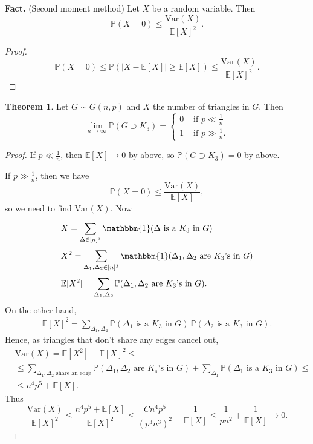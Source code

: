 \documentclass{article}
\theoremstyle{definition}
\newtheorem{theorem}{Theorem}[section]
\begin{document}
\textbf{Fact.} (Second moment method) Let $X$ be a random variable. Then \[
\mathbb{P}(X = 0) \le \frac{\text{Var}(X)}{\mathbb{E}[X]^2}.
\] 
\begin{proof}
    \[
    \mathbb{P}(X = 0) \le \mathbb{P}(|X - \mathbb{E}[X]| \ge \mathbb{E}[X]) \le \frac{\text{Var}(X)}{\mathbb{E}[X]^2}.
    \]
\end{proof}
\begin{theorem}
    Let $G \sim G(n,p)$ and $X$ the number of triangles in $G$. Then \[
    \lim_{n \to \infty} \mathbb{P}(G \supset K_3) = \begin{cases}
        0 &\text{ if } p \ll \frac{1}{n}\\
        1 &\text{ if } p \gg \frac{1}{n}.
    \end{cases}
    \]
\end{theorem}
\begin{proof}
    If $p \ll \frac{1}{n}$, then $\mathbb{E}[X] \to 0$ by above, so $\mathbb{P}(G \supset K_3) = 0$ by above.
    \vspace{1mm}
    
    If $p \gg \frac{1}{n}$, then we have \[
    \mathbb{P}(X=0)\le \frac{\text{Var}(X)}{\mathbb{E}[X]},
    \]
    so we need to find $\text{Var}(X)$. Now 
    \begin{align*}
    &X = \sum_{\Delta \in [n]^3}^{} \mathbbm{1}(\Delta \text{ is a }K_3 \text{ in }G) \\
    &X^2 = \sum_{\Delta_1,\Delta_2 \in [n]^3}^{} \mathbbm{1}(\Delta_1,\Delta_2 \text{ are }K_3\text{'s in }G) \\
    &\mathbb{E}[X^2] = \sum_{\Delta_1,\Delta_2}^{} \mathbb{P}(\Delta_1,\Delta_2 \text{ are }K_3 \text{'s in }G).
    \end{align*}
    On the other hand, 
    \begin{align*}
        \mathbb{E}[X]^2 = \sum_{\Delta_1,\Delta_2}^{} \mathbb{P}(\Delta_1 \text{ is a }K_3 \text{ in }G) ~ \mathbb{P}(\Delta_2 \text{ is a }K_3 \text{ in }G).
    \end{align*}
    Hence, as triangles that don't share any edges cancel out,
    \begin{align*}
        &\text{Var}(X) = \mathbb{E}[X^2] - \mathbb{E}[X]^2 \le \\
        &\le \sum_{\Delta_1,\Delta_2 \text{ share an edge}}^{} \mathbb{P}(\Delta_1,\Delta_2 \text{ are }K_s\text{'s in }G) + \sum_{\Delta_1}^{} \mathbb{P}(\Delta_1 \text{ is a }K_3 \text{ in }G) \le \\
        &\le n^4 p^5 + \mathbb{E}[X].
    \end{align*}
    Thus \[
    \frac{\text{Var}(X)}{\mathbb{E}[X]^2} \le \frac{n^4 p^5 + \mathbb{E}[X]}{\mathbb{E}[X]^2} \le \frac{C n^4 p^5}{(p^3n^3)^2} + \frac{1}{\mathbb{E}[X]} \le \frac{1}{pn^2} + \frac{1}{\mathbb{E}[X]} \to 0.
    \]
\end{proof}
\end{document}

